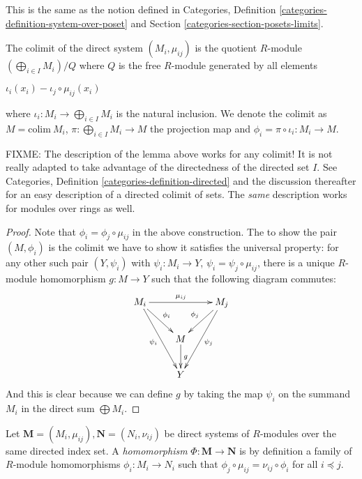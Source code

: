 \noindent
This is the same as the notion defined in Categories,
Definition \ref{categories-definition-system-over-poset}
and Section \ref{categories-section-posets-limits}.

\begin{lemma}
\label{lemma-directed-colimit}
The colimit of the direct system
$(M_i, \mu_{ij})$ is the quotient $R$-module
$(\bigoplus_{i\in I} M_i) /Q$ where $Q$ is the
free $R$-module generated by all elements
\begin{center}
$\iota_{i}(x_i)-\iota_{j}\circ \mu_{ij}(x_i)$
\end{center}
where $\iota_{i}:M_i \rightarrow \bigoplus_{i\in I} M_i$
is the natural inclusion. We 
denote the colimit as
$M=\text{colim}\ M_i$,
$\pi:\bigoplus_{i\in I} M_i \rightarrow M$ the 
projection map and $\phi_{i}=\pi \circ
\iota_{i}:M_i\rightarrow M$.
\end{lemma}

\noindent
FIXME: The description of the lemma above
works for any colimit! It is not really adapted
to take advantage of the directedness of the
directed set $I$. See Categories, Definition
\ref{categories-definition-directed} and the 
discussion thereafter for an easy description
of a directed colimit of sets. The {\it same}
description works for modules over rings as well.

\begin{proof}
Note that $\phi_{i}=\phi_{j}\circ \mu_{ij}$ in the above construction.
The to show the pair $(M,\phi_{i})$ is the colimit we have
to show it satisfies the universal property: for any other such pair 
$(Y,\psi_{i})$ with $\psi_{i}:M_i\rightarrow
Y$, $\psi_{i}=\psi_{j}\circ \mu_{ij}$, there is a unique $R$-module 
homomorphism $g:M\rightarrow Y$ such that the
following diagram commutes:
\[ \xymatrix{
    M_i \ar[rr]^{\mu_{ij}} \ar[dr]^{\phi_{i}} \ar[ddr]_{\psi_{i}} &
    &M_j\ar[dl]_{\phi_{j}} \ar[ddl]^{\psi_{j}} \\
    &M \ar[d]^{g}\\
    &Y
    }
\]
And this is clear because we can define $g$ by taking the
map $\psi_i$ on the summand $M_i$ in the direct sum
$\bigoplus M_i$.
\end{proof}

\begin{definition}
\label{definition-homomorphism-directed-systems}
Let $\textbf{M}=(M_i,\mu_{ij}), \textbf{N}=(N_i,\nu_{ij})$ be 
direct systems of $R$-modules over
the same directed index set.
A {\it homomorphism}
$\Phi:\textbf{M}\rightarrow \textbf{N}$ is by definition a 
family of $R$-module homomorphisms
$\phi_{i}:M_i\rightarrow N_{i}$
such that $\phi_{j}\circ \mu_{ij}=\nu_{ij}\circ 
\phi_{i}$ for all $i\preceq j$.
\end{definition}

